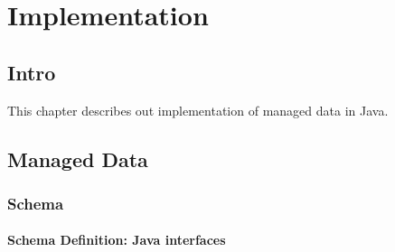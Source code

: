 



\chapter{Implementation}\label{Implementation}
\section{Intro}\label{sec:Intro Implementation}
This chapter describes out implementation of managed data in Java.

\section{Managed Data}\label{sec:Managed Data Implementation}

\subsection{Schema}\label{subsec:Schema Implementation}

\subsubsection{Schema Definition: Java interfaces}\label{Schema Definition: Java interfaces}

